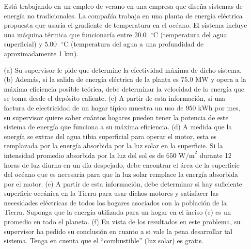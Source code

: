\item Está trabajando en un empleo de verano en una empresa que diseña sistemas de energía no tradicionales. La compañía trabaja en una planta de energía eléctrica propuesta que usaría el gradiente de temperatura en el océano. El sistema incluye una máquina térmica que funcionaría entre $20.0\text{ }^\circ\text{C}$ (temperatura del agua superficial) y $5.00\text{ }^\circ\text{C}$ (temperatura del agua a una profundidad de aproximadamente 1 km). 

(a) Su supervisor le pide que determine la efectividad máxima de dicho sistema. 
(b) Además, si la salida de energía eléctrica de la planta es $75.0\text{ MW}$ y opera a la máxima eficiencia posible teórica, debe determinar la velocidad de la energía que se toma desde el depósito caliente. 
(c) A partir de esta información, si una factura de electricidad de un hogar típico muestra un uso de $950\text{ kWh}$ por mes, su supervisor quiere saber cuántos hogares pueden tener la potencia de este sistema de energía que funciona a su máxima eficiencia. 
(d) A medida que la energía se extrae del agua tibia superficial para operar el motor, esta es remplazada por la energía absorbida por la luz solar en la superficie. Si la intensidad promedio absorbida por la luz del sol es de $650\text{ W/m}^2$ durante 12 horas de luz diurna en un día despejado, debe encontrar el área de la superficie del océano que es necesaria para que la luz solar remplace la energía absorbida por el motor. 
(e) A partir de esta información, debe determinar si hay suficiente superficie oceánica en la Tierra para usar dichos motores y satisfacer las necesidades eléctricas de todos los hogares asociados con la población de la Tierra. Suponga que la energía utilizada para un hogar en el inciso (c) es un promedio en todo el planeta. 
(f) En vista de los resultados en este problema, su supervisor ha pedido su conclusión en cuanto a si vale la pena desarrollar tal sistema. Tenga en cuenta que el “combustible” (luz solar) es gratis.

